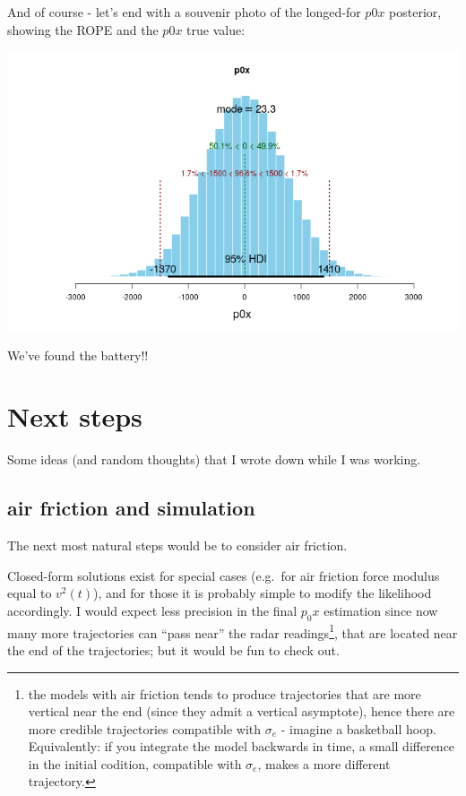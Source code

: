 \documentclass[]{article}
\begin{document}
And of course - let's end with a souvenir photo of the longed-for
\(p0x\) posterior, showing the ROPE and the \(p0x\) true value:

\begin{center}\includegraphics[width=1.0\textwidth]{bayesian_artillery_files/figure-latex/jags_posterior-1} \end{center}

We've found the battery!!

\hypertarget{next-steps}{%
\section{Next steps}\label{next-steps}}

Some ideas (and random thoughts) that I wrote down while I was working.

\hypertarget{air-friction-and-simulation}{%
\subsection{air friction and
simulation}\label{air-friction-and-simulation}}

The next most natural steps would be to consider air friction.

Closed-form solutions exist for special cases (e.g.~for air friction
force modulus equal to \(v^2(t)\)), and for those it is probably simple
to modify the likelihood accordingly. I would expect less precision in
the final \(p_0x\) estimation since now many more trajectories can
``pass near'' the radar readings\footnote{the models with air friction
  tends to produce trajectories that are more vertical near the end
  (since they admit a vertical asymptote), hence there are more credible
  trajectories compatible with \(\sigma_e\) - imagine a basketball hoop.
  Equivalently: if you integrate the model backwards in time, a small
  difference in the initial codition, compatible with \(\sigma_e\),
  makes a more different trajectory.}, that are located near the end of
the trajectories; but it would be fun to check out.
\end{document}

